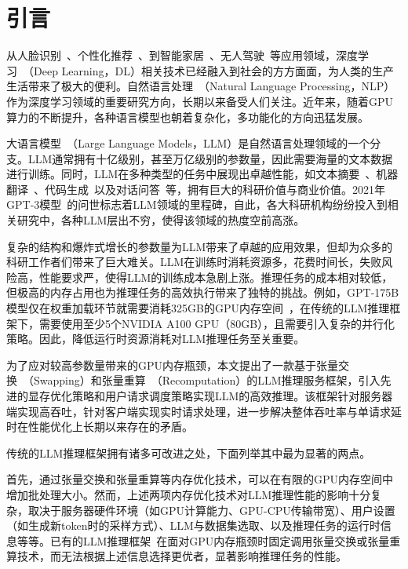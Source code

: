 \section{引言}

从人脸识别~\cite{Face-Recognition}、个性化推荐~\cite{Personal-Recommendation}、到智能家居~\cite{Smart-Home}、无人驾驶~\cite{Self-Driving-Car}等应用领域，深度学习~\cite{Deep-Learning}（Deep Learning，DL）相关技术已经融入到社会的方方面面，为人类的生产生活带来了极大的便利。自然语言处理~\cite{NLP}（Natural Language Processing，NLP）作为深度学习领域的重要研究方向，长期以来备受人们关注。近年来，随着GPU算力的不断提升，各种语言模型也朝着复杂化，多功能化的方向迅猛发展。

大语言模型~\cite{LLM}（Large Language Models，LLM）是自然语言处理领域的一个分支。LLM通常拥有十亿级别，甚至万亿级别的参数量，因此需要海量的文本数据进行训练。同时，LLM在多种类型的任务中展现出卓越性能，如文本摘要~\cite{Text-Summarization}、机器翻译~\cite{Machine-Translation}、代码生成~\cite{Code-Generation}以及对话问答~\cite{Question-Answer}等，拥有巨大的科研价值与商业价值。2021年GPT-3模型~\cite{Text-Summarization, GPT3}的问世标志着LLM领域的里程碑，自此，各大科研机构纷纷投入到相关研究中，各种LLM层出不穷，使得该领域的热度空前高涨。

复杂的结构和爆炸式增长的参数量为LLM带来了卓越的应用效果，但却为众多的科研工作者们带来了巨大难关。LLM在训练时消耗资源多，花费时间长，失败风险高，性能要求严，使得LLM的训练成本急剧上涨。推理任务的成本相对较低，但极高的内存占用也为推理任务的高效执行带来了独特的挑战。例如，GPT-175B模型仅在权重加载环节就需要消耗325GB的GPU内存空间~\cite{GPT-175B资源消耗}，在传统的LLM推理框架下，需要使用至少5个NVIDIA A100 GPU（80GB），且需要引入复杂的并行化策略。因此，降低运行时资源消耗对LLM推理任务至关重要。

为了应对较高参数量带来的GPU内存瓶颈，本文提出了一款基于张量交换~\cite{Swapping}（Swapping）和张量重算~\cite{Recomputation}（Recomputation）的LLM推理服务框架，引入先进的显存优化策略和用户请求调度策略实现LLM的高效推理。该框架针对服务器端实现高吞吐，针对客户端实现实时请求处理，进一步解决整体吞吐率与单请求延时在性能优化上长期以来存在的矛盾。

传统的LLM推理框架拥有诸多可改进之处，下面列举其中最为显著的两点。 \par

首先，通过张量交换和张量重算等内存优化技术，可以在有限的GPU内存空间中增加批处理大小。然而，上述两项内存优化技术对LLM推理性能的影响十分复杂，取决于服务器硬件环境（如GPU计算能力、GPU-CPU传输带宽）、用户设置（如生成新token时的采样方式）、LLM与数据集选取、以及推理任务的运行时信息等等。已有的LLM推理框架~\cite{Swapping, vLLM, ORCA}在面对GPU内存瓶颈时固定调用张量交换或张量重算技术，而无法根据上述信息选择更优者，显著影响推理任务的性能。

